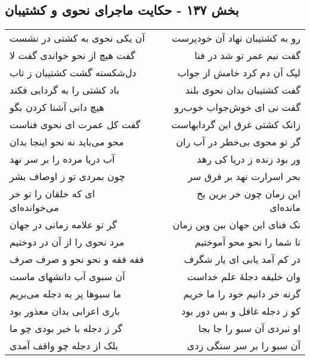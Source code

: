 \begin{center}
\section*{بخش ۱۳۷ - حکایت ماجرای نحوی و کشتیبان}
\label{sec:sh137}
\begin{longtable}{l p{0.5cm} r}
آن یکی نحوی به کشتی در نشست
&&
رو به کشتیبان نهاد آن خودپرست
\\
گفت هیچ از نحو خواندی گفت لا
&&
گفت نیم عمر تو شد در فنا
\\
دل‌شکسته گشت کشتیبان ز تاب
&&
لیک آن دم کرد خامش از جواب
\\
باد کشتی را به گردابی فکند
&&
گفت کشتیبان بدان نحوی بلند
\\
هیچ دانی آشنا کردن بگو
&&
گفت نی ای خوش‌جواب خوب‌رو
\\
گفت کل عمرت ای نحوی فناست
&&
زانک کشتی غرق این گردابهاست
\\
محو می‌باید نه نحو اینجا بدان
&&
گر تو محوی بی‌خطر در آب ران
\\
آب دریا مرده را بر سر نهد
&&
ور بود زنده ز دریا کی رهد
\\
چون بمردی تو ز اوصاف بشر
&&
بحر اسرارت نهد بر فرق سر
\\
ای که خلقان را تو خر می‌خوانده‌ای
&&
این زمان چون خر برین یخ مانده‌ای
\\
گر تو علامه زمانی در جهان
&&
نک فنای این جهان بین وین زمان
\\
مرد نحوی را از آن در دوختیم
&&
تا شما را نحو محو آموختیم
\\
فقه فقه و نحو نحو و صرف صرف
&&
در کم آمد یابی ای یار شگرف
\\
آن سبوی آب دانشهای ماست
&&
وان خلیفه دجلهٔ علم خداست
\\
ما سبوها پر به دجله می‌بریم
&&
گرنه خر دانیم خود را ما خریم
\\
باری اعرابی بدان معذور بود
&&
کو ز دجله غافل و بس دور بود
\\
گر ز دجله با خبر بودی چو ما
&&
او نبردی آن سبو را جا بجا
\\
بلک از دجله چو واقف آمدی
&&
آن سبو را بر سر سنگی زدی
\\
\end{longtable}
\end{center}
